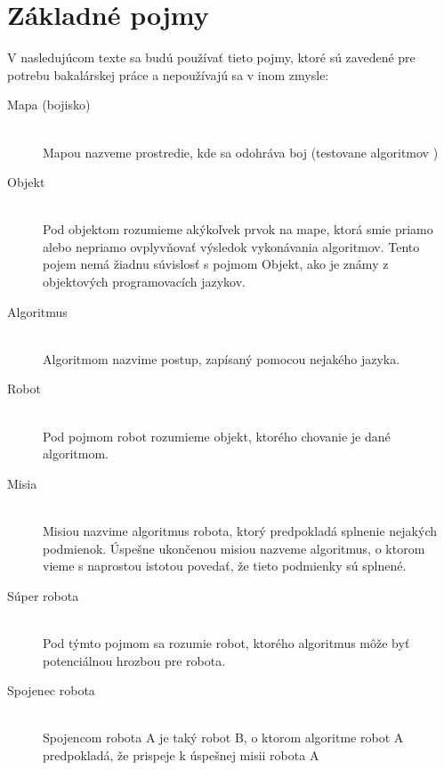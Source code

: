 \section{ Základné pojmy }
V nasledujúcom texte sa budú používať tieto pojmy, ktoré sú zavedené pre potrebu bakalárskej práce a nepoužívajú sa v inom zmysle:
\begin{description}
\item[Mapa (bojisko)]\hfill \\
	Mapou nazveme prostredie, kde sa odohráva boj (testovane algoritmov )
\item[Objekt]\hfill \\
	Pod objektom rozumieme akýkoľvek prvok na mape, ktorá smie priamo alebo nepriamo ovplyvňovať výsledok vykonávania algoritmov. Tento pojem nemá žiadnu súvislosť s pojmom Objekt, ako je známy z objektových programovacích jazykov.
\item[Algoritmus]\hfill \\
	Algoritmom nazvime postup, zapísaný pomocou nejakého jazyka. 
\item[Robot]\hfill \\
	Pod pojmom robot rozumieme objekt, ktorého chovanie je dané algoritmom.
\item[Misia]\hfill \\
	Misiou nazvime algoritmus robota, ktorý predpokladá splnenie nejakých podmienok. Úspešne ukončenou misiou nazveme algoritmus, o ktorom vieme s naprostou istotou povedať, že tieto podmienky sú splnené.
\item[Súper robota]\hfill \\
	Pod týmto pojmom sa rozumie robot, ktorého algoritmus môže byť potenciálnou hrozbou pre robota.
\item[Spojenec robota] \hfill \\
	Spojencom robota A je taký robot B, o ktorom algoritme robot A predpokladá, že prispeje k úspešnej misii robota A %
\end{description}

